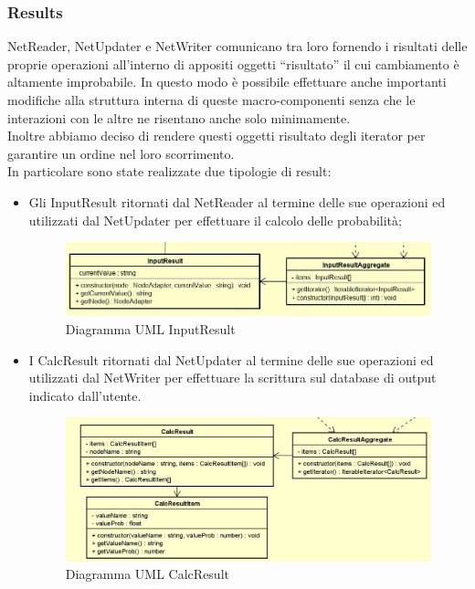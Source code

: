 \subsubsection{Results}
NetReader, NetUpdater e NetWriter comunicano tra loro fornendo i risultati delle proprie operazioni  all'interno di appositi oggetti “risultato” il cui cambiamento è altamente improbabile. In questo modo è possibile effettuare anche importanti modifiche alla struttura interna di queste macro-componenti senza che le interazioni con le altre ne risentano anche solo minimamente.\\
Inoltre abbiamo deciso di rendere questi oggetti risultato degli iterator per garantire un ordine nel loro scorrimento.\\
In particolare sono state realizzate due tipologie di result:
\begin{itemize}
	\item Gli InputResult ritornati dal NetReader al termine delle sue operazioni ed utilizzati dal NetUpdater per effettuare il calcolo delle probabilità;
	\begin{figure} [H]
		\centering
		\includegraphics[scale=0.65]{Img/InputResult}
		\caption{Diagramma UML InputResult}\label{}
	\end{figure}
	\item I CalcResult ritornati dal NetUpdater al termine delle sue operazioni ed utilizzati dal NetWriter per effettuare la scrittura sul database di output indicato dall'utente.
	\begin{figure} [H]
		\centering
		\includegraphics[scale=0.5]{Img/CalcResult}
		\caption{Diagramma UML CalcResult}\label{}
	\end{figure}
\end{itemize}
